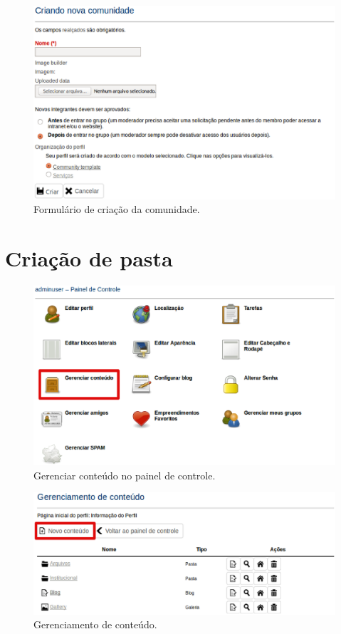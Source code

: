 \begin{figure}[H]
     \centering
       \includegraphics[keepaspectratio=true,scale=0.49]{figuras/criandoComunidade.eps}
     \caption{Formulário de criação da comunidade.}
     \label{fig:criandoComunidade}
\end{figure}

\section{Criação de pasta}

\begin{figure}[h]
     \centering
       \includegraphics[keepaspectratio=true,scale=0.49]{figuras/painelControleGerenciarConteudo.eps}
     \caption{Gerenciar conteúdo no painel de controle.}
     \label{fig:GerContPainelControle}
\end{figure}

\begin{figure}[H]
     \centering
       \includegraphics[keepaspectratio=true,scale=0.49]{figuras/gerenciamentoConteudo.eps}
     \caption{Gerenciamento de conteúdo.}
     \label{fig:GerenciamentoConteudo}
\end{figure}

